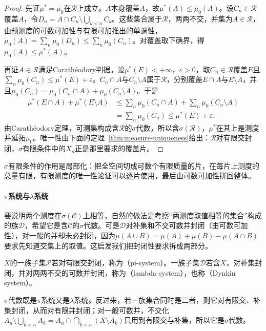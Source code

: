 \begin{proof}
先证$\mu^*=\mu_0$在$\mathcal R$上成立。$A$本身覆盖$A$，故$\mu^*(A)\le\mu_0(A)$。设$C_n\in\mathcal R$覆盖$A$，令$D_n=A\cap C_n\setminus\bigcup_{k<n}C_k$。这些集合属于$\mathcal R$，两两不交，并集为$A\in\mathcal R$，由预测度的可数可加性与有限可加推出的单调性，$\mu_0(A)=\sum_n\mu_0(D_n)\le\sum_n\mu_0(C_n)$。对覆盖取下确界，得$\mu_0(A)\le\mu^*(A)$。

再证$A\in\mathcal R$满足Carathéodory判据。设$\mu^*(E)<+\infty$，$\varepsilon>0$，取$C_n\in\mathcal R$覆盖$E$且$\sum_n\mu_0(C_n)\le\mu^*(E)+\varepsilon$。$C_n\cap A$与$C_n\setminus A$属于$\mathcal R$，分别覆盖$E\cap A$与$E\setminus A$，并且$\mu_0(C_n)=\mu_0(C_n\cap A)+\mu_0(C_n\setminus A)$。于是
\[
 \begin{aligned}
  \mu^*(E\cap A)+\mu^*(E\setminus A)
  &\le\sum_n\mu_0(C_n\cap A)+\sum_n\mu_0(C_n\setminus A)\\
  &=\sum_n\mu_0(C_n)\le\mu^*(E)+\varepsilon.
 \end{aligned}
\]
由Carathéodory定理，可测集构成含$\mathcal R$的$\sigma$代数，所以含$\sigma(\mathcal R)$，$\mu^*$在其上是测度并延拓$\mu_0$。唯一性由下面的定理~\ref{thm:measure-uniqueness}给出：$\mathcal R$对有限交封闭，$\sigma$有限条件中的$X_n$正是那里要求的覆盖片。
\end{proof}

$\sigma$有限条件的作用是局部化：把全空间切成可数个有限质量的片，在每片上测度的总量有限，有限测度的唯一性论证可以逐片使用，最后由可数可加性拼回整体。

\paragraph{$\pi$系统与$\lambda$系统}
要说明两个测度在$\sigma(\mathcal C)$上相等，自然的做法是考察“两测度取值相等的集合”构成的族$\mathcal D$，希望它是含$\mathcal C$的$\sigma$代数。可是$\mathcal D$对补集和不交可数并封闭（由可数可加性），对一般的并却未必封闭，因为$\mu(A\cup B)=\mu(A)+\mu(B)-\mu(A\cap B)$要求先知道交集上的取值。这启发我们把封闭性要求拆成两部分。

\begin{definition}
\label{def:measure-pi-lambda-systems}
$X$的一族子集$\mathcal P$若对有限交封闭，称为（pi-system）。一族子集$\mathcal D$若含$X$，对补集封闭，并对两两不交的可数并封闭，称为（lambda-system），也称（Dynkin system）。
\end{definition}

$\sigma$代数既是$\pi$系统又是$\lambda$系统。反过来，若一族集合同时是二者，则它对有限交、补集封闭，从而对有限并封闭；对一般可数并，不交化$A_n\setminus\bigcup_{k<n}A_k=A_n\cap\bigcap_{k<n}(X\setminus A_k)$只用到有限交与补集，所以它是$\sigma$代数。

